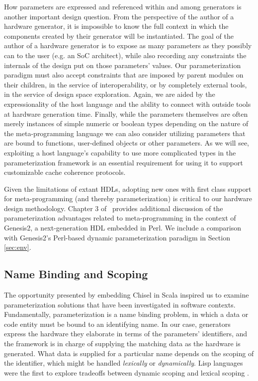 How parameters are expressed and referenced within and among generators is another important design question.
From the perspective of the author of a hardware generator, it is impossible to know the full context in which the components created by their generator will be instantiated.
The goal of the author of a hardware generator is to expose as many parameters as they possibly can to the user (e.g. an SoC architect),
while also recording any constraints the internals of the design put on those parameters' values.
Our parameterization paradigm must also accept constraints that are imposed by parent modules on their children, in the service of interoperability,
or by completely external tools, in the service of design space exploration.
Again, we are aided by the expressionality of the host language and the ability to connect with outside tools at hardware generation time.
Finally, while the parameters themselves are often merely instances of simple numeric or boolean types
depending on the nature of the meta-programming language we can also consider utilizing parameters that are bound to functions, user-defined objects
or other parameters.
As we will see, exploiting a host language's capability to use more complicated types in the parameterization framework
is an essential requirement for using it to support customizable cache coherence protocols.

Given the limitations of extant HDLs, adopting new ones with first class support for meta-programming (and thereby parameterization)
is critical to our hardware design methodology.
Chapter 3 of~\cite{shacham2011chip} provides additional discussion of the 
parameterization advantages related to meta-programming
in the context of Genesis2, a next-generation HDL embedded in Perl.
We include a comparison with Genesis2's Perl-based dynamic parameterization paradigm in Section \ref{sec:env}.

\subsection{Name Binding and Scoping}

The opportunity presented by embedding Chisel in Scala inspired us to examine parameterization solutions that have been investigated in software contexts.
Fundamentally, parameterization is a name binding problem, in which a data or code entity must be bound to an identifying name.
In our case, generators express the hardware they elaborate in terms of the parameters' identifiers, and the framework is in charge of supplying the matching data
as the hardware is generated.
What data is supplied for a particular name depends on the scoping of the identifier, which might be handled \emph{lexically} or \emph{dynamically}.
Lisp languages were the first to explore tradeoffs between dynamic scoping and lexical scoping \cite{gordon}.

